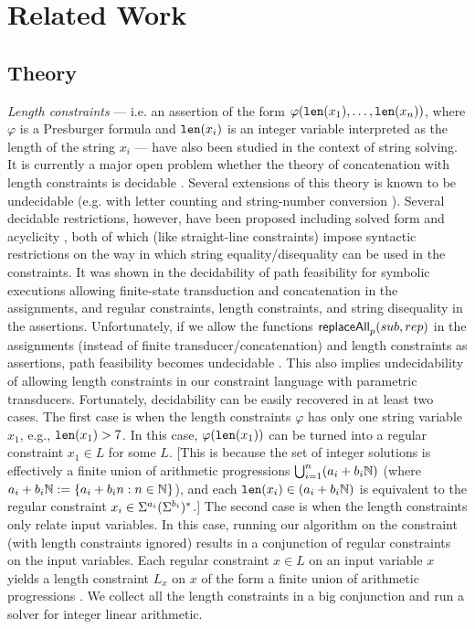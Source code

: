 \section{Related Work}
\label{sec:related}

\subsection{Theory}
\emph{Length constraints} --- i.e. an assertion of the form 
$\varphi(\texttt{len}(x_1),\ldots,\texttt{len}(x_n))$, where $\varphi$ is a Presburger formula
and $\texttt{len}(x_i)$ is an integer variable interpreted as the length of the string
$x_i$ --- have also been studied in the context of string solving. It is
currently a major open problem whether the theory of concatenation with length
constraints is decidable \cite{Vijay-length}. Several extensions of this 
theory is known to be undecidable (e.g. with letter counting \cite{buchi} and
string-number conversion \cite{GB16}).
Several decidable restrictions, however,
have been proposed including solved form \cite{Vijay-length} and acyclicity 
\cite{Abdulla14}, both of which (like straight-line constraints) impose 
syntactic restrictions on the way in which string equality/disequality can be
used in the constraints. It was shown in \cite{LB16} the decidability of path 
feasibility for symbolic
executions allowing finite-state transduction and concatenation in the 
assignments, and regular constraints, length constraints, and string disequality
in the assertions. Unfortunately, if we allow the functions
$\mathsf{replaceAll}_p(sub,rep)$ in the assignments (instead of
finite transducer/concatenation) and length constraints as assertions, path
feasibility becomes undecidable \cite{CCHLW18}. This also implies undecidability
of allowing length constraints in our constraint language with parametric
transducers. Fortunately, decidability can be easily recovered in at least two
cases. The first case is when the length constraints $\varphi$ has only
one string variable $x_1$, e.g., $\texttt{len}(x_1) > 7$. In this case,
$\varphi(\texttt{len}(x_1))$ can be turned into a regular constraint $x_1 \in L$ for
some $L$. [This is because the set of integer solutions is effectively
a finite union of arithmetic progressions $\bigcup_{i=1}^n (a_i + b_i\mathbb{N})$
(where $a_i + b_i\mathbb{N} := \{ a_i + b_in : n \in \mathbb{N}\}$), and each 
$\texttt{len}(x_i) \in (a_i + b_i\mathbb{N})$ is equivalent to the regular constraint 
$x_i \in \Sigma^{a_i} (\Sigma^{b_i})^*$.] The second case is when
the length constraints only relate input variables. In this case, running
our algorithm on the constraint (with length constraints ignored)
results in a conjunction of regular constraints on the input variables. Each
regular constraint $x \in L$ on an input variable $x$ yields a length
constraint $L_x$ on $x$ of the form a finite union of arithmetic progressions 
\cite{Kozen-automata}. We collect all the length constraints in a big
conjunction and run a solver for integer linear arithmetic.

